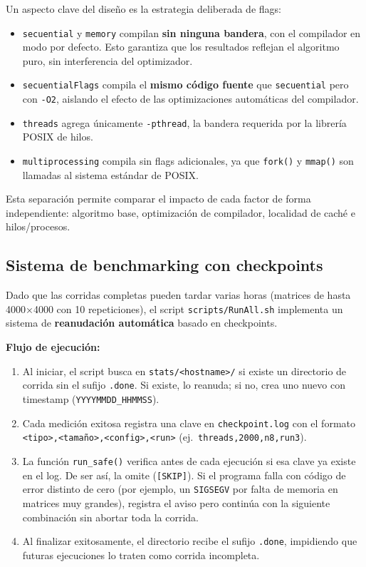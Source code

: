 \documentclass{article}
\begin{document}
Un aspecto clave del diseño es la estrategia deliberada de flags:

\begin{itemize}
    \item \texttt{secuential} y \texttt{memory} compilan \textbf{sin ninguna bandera}, con el compilador en modo por defecto. Esto garantiza que los resultados reflejan el algoritmo puro, sin interferencia del optimizador.
    \item \texttt{secuentialFlags} compila el \textbf{mismo código fuente} que \texttt{secuential} pero con \texttt{-O2}, aislando el efecto de las optimizaciones automáticas del compilador.
    \item \texttt{threads} agrega únicamente \texttt{-pthread}, la bandera requerida por la librería POSIX de hilos.
    \item \texttt{multiprocessing} compila sin flags adicionales, ya que \texttt{fork()} y \texttt{mmap()} son llamadas al sistema estándar de POSIX.
\end{itemize}

Esta separación permite comparar el impacto de cada factor de forma independiente: algoritmo base, optimización de compilador, localidad de caché e hilos/procesos.

\subsection{Sistema de benchmarking con checkpoints}

Dado que las corridas completas pueden tardar varias horas (matrices de hasta 4000×4000 con 10 repeticiones), el script \texttt{scripts/RunAll.sh} implementa un sistema de \textbf{reanudación automática} basado en checkpoints.

\textbf{Flujo de ejecución:}
\begin{enumerate}
    \item Al iniciar, el script busca en \texttt{stats/<hostname>/} si existe un directorio de corrida sin el sufijo \texttt{.done}. Si existe, lo reanuda; si no, crea uno nuevo con timestamp (\texttt{YYYYMMDD\_HHMMSS}).
    \item Cada medición exitosa registra una clave en \texttt{checkpoint.log} con el formato \texttt{<tipo>,<tamaño>,<config>,<run>} (ej.\ \texttt{threads,2000,n8,run3}).
    \item La función \texttt{run\_safe()} verifica antes de cada ejecución si esa clave ya existe en el log. De ser así, la omite (\texttt{[SKIP]}). Si el programa falla con código de error distinto de cero (por ejemplo, un \texttt{SIGSEGV} por falta de memoria en matrices muy grandes), registra el aviso pero continúa con la siguiente combinación sin abortar toda la corrida.
    \item Al finalizar exitosamente, el directorio recibe el sufijo \texttt{.done}, impidiendo que futuras ejecuciones lo traten como corrida incompleta.
\end{enumerate}
\end{document}
